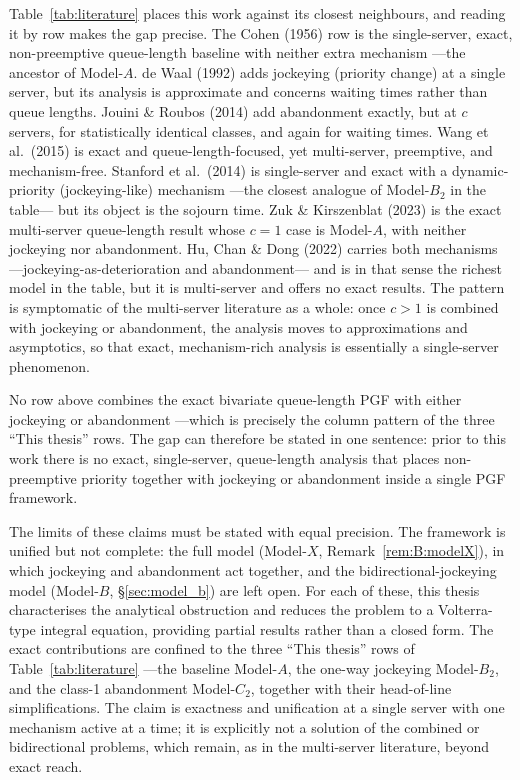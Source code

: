Table~\ref{tab:literature} places this work against its closest neighbours, and reading it by row makes the gap precise. The Cohen (1956) row is the single-server, exact, non-preemptive queue-length baseline with neither extra mechanism ---the ancestor of Model-$A$. de Waal (1992) adds jockeying (priority change) at a single server, but its analysis is approximate and concerns waiting times rather than queue lengths. Jouini \& Roubos (2014) add abandonment exactly, but at $c$ servers, for statistically identical classes, and again for waiting times. Wang et al.\ (2015) is exact and queue-length-focused, yet multi-server, preemptive, and mechanism-free. Stanford et al.\ (2014) is single-server and exact with a dynamic-priority (jockeying-like) mechanism ---the closest analogue of Model-$B_2$ in the table--- but its object is the sojourn time. Zuk \& Kirszenblat (2023) is the exact multi-server queue-length result whose $c=1$ case is Model-$A$, with neither jockeying nor abandonment. Hu, Chan \& Dong (2022) carries both mechanisms ---jockeying-as-deterioration and abandonment--- and is in that sense the richest model in the table, but it is multi-server and offers no exact results. The pattern is symptomatic of the multi-server literature as a whole: once $c>1$ is combined with jockeying or abandonment, the analysis moves to approximations and asymptotics, so that exact, mechanism-rich analysis is essentially a single-server phenomenon.

No row above combines the exact bivariate queue-length PGF with either jockeying or abandonment ---which is precisely the column pattern of the three ``This thesis'' rows. The gap can therefore be stated in one sentence: prior to this work there is no exact, single-server, queue-length analysis that places non-preemptive priority together with jockeying or abandonment inside a single PGF framework.

The limits of these claims must be stated with equal precision. The framework is unified but not complete: the full model (Model-$X$, Remark~\ref{rem:B:modelX}), in which jockeying and abandonment act together, and the bidirectional-jockeying model (Model-$B$, \S\ref{sec:model_b}) are left open. For each of these, this thesis characterises the analytical obstruction and reduces the problem to a Volterra-type integral equation, providing partial results rather than a closed form. The exact contributions are confined to the three ``This thesis'' rows of Table~\ref{tab:literature} ---the baseline Model-$A$, the one-way jockeying Model-$B_2$, and the class-1 abandonment Model-$C_2$, together with their head-of-line simplifications. The claim is exactness and unification at a single server with one mechanism active at a time; it is explicitly not a solution of the combined or bidirectional problems, which remain, as in the multi-server literature, beyond exact reach.
